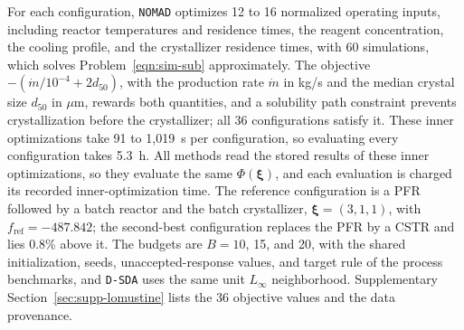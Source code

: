 \documentclass{article}
\begin{document}
For each configuration, \texttt{NOMAD} optimizes 12 to 16 normalized operating inputs, including reactor temperatures and residence times, the reagent concentration, the cooling profile, and the crystallizer residence times, with 60 simulations, which solves Problem~\eqref{eqn:sim-sub} approximately.
The objective \(-(\dot m/10^{-4}+2d_{50})\), with the production rate \(\dot m\) in kg/s and the median crystal size \(d_{50}\) in \(\mu\)m, rewards both quantities, and a solubility path constraint prevents crystallization before the crystallizer; all 36 configurations satisfy it.
These inner optimizations take 91 to 1,019~s per configuration, so evaluating every configuration takes 5.3~h.
All methods read the stored results of these inner optimizations, so they evaluate the same \(\Phi(\boldsymbol\xi)\), and each evaluation is charged its recorded inner-optimization time.
The reference configuration is a PFR followed by a batch reactor and the batch crystallizer, \(\boldsymbol\xi=(3,1,1)\), with \(f_{\mathrm{ref}}=-487.842\); the second-best configuration replaces the PFR by a CSTR and lies 0.8\% above it.
The budgets are \(B=10\), 15, and 20, with the shared initialization, seeds, unaccepted-response values, and target rule of the process benchmarks, and \texttt{D-SDA} uses the same unit \(L_\infty\) neighborhood.
Supplementary Section~\ref{sec:supp-lomustine} lists the 36 objective values and the data provenance.
\end{document}
